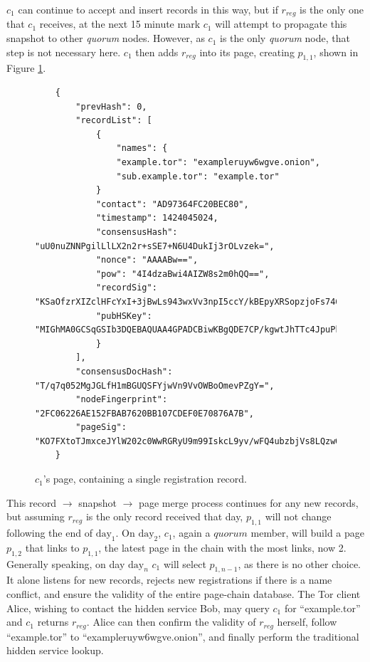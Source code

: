 $ c_{1} $ can continue to accept and insert records in this way, but if $ r_{reg} $ is the only one that $ c_{1} $ receives, at the next 15 minute mark $ c_{1} $ will attempt to propagate this snapshot to other \emph{quorum} nodes. However, as $ c_{1} $ is the only \emph{quorum} node, that step is not necessary here. $ c_{1} $ then adds $ r_{reg} $ into its page, creating $ p_{1,1} $, shown in Figure \ref{fig:c1page}.

\begin{figure}
	\begin{lstlisting}
	{
		"prevHash": 0,
		"recordList": [
			{
				"names": {
				"example.tor": "exampleruyw6wgve.onion",
				"sub.example.tor": "example.tor"
			}
			"contact": "AD97364FC20BEC80",
			"timestamp": 1424045024,
			"consensusHash": "uU0nuZNNPgilLlLX2n2r+sSE7+N6U4DukIj3rOLvzek=",
			"nonce": "AAAABw==",
			"pow": "4I4dzaBwi4AIZW8s2m0hQQ==",
			"recordSig": 	"KSaOfzrXIZclHFcYxI+3jBwLs943wxVv3npI5ccY/kBEpyXRSopzjoFs746n0tJqUpdY4Kbe6DBwERaN7ELmSSK9Pu6q8QeKzNAh+QOnKl0fKBN7fqowjkQ3ktFkR0Vuox9WrrbNTMa4+up0Np52hlbKA3zSRz4fbR9NVlh6uuQ=",
			"pubHSKey": "MIGhMA0GCSqGSIb3DQEBAQUAA4GPADCBiwKBgQDE7CP/kgwtJhTTc4JpuPkvA7Ln9wgc+fgTKgkyUp1zusxgUAn1c1MGx4YhO42KPB7dyZOf3pcRk94XsYFY1ULkF2+tf9KdNe7GFzJyMFCQENnUcVXbcwLH4vAeiGK7R/nScbCbyc9LT+VE1fbKchTL1QzLVBLqJTxhR+9YPi8x+QIFAdZ8BJs="
			}
		],
		"consensusDocHash": "T/q7q052MgJGLfH1mBGUQSFYjwVn9VvOWBoOmevPZgY=",
		"nodeFingerprint": "2FC06226AE152FBAB7620BB107CDEF0E70876A7B",
		"pageSig": "KO7FXtoTJmxceJYlW202c0WwRGRyU9m99IskcL9yv/wFQ4ubzbjVs8LQzwQub9kDJ8Htpc9rRZvneRRbusFv1nvaeJw+WgRt+Tck0uapndHKYaQcK3XTIFYdmT1lLm7QxSKjnIxgBkwKT0QWdGLUhuRgGe5CXmqrPeDfU/gsgLs="
	}
	\end{lstlisting}
	\caption{$ c_{1} $'s page, containing a single registration record.}
	\label{fig:c1page}
\end{figure}

This record $ \to $ snapshot $ \to $ page merge process continues for any new records, but assuming $ r_{reg} $ is the only record received that day, $ p_{1,1} $ will not change following the end of $ \textrm{day}_{1} $. On $ \textrm{day}_{2} $, $ c_{1} $, again a $ quorum $ member, will build a page $ p_{1,2} $ that links to $ p_{1,1} $, the latest page in the chain with the most links, now 2. Generally speaking, on day $ \textrm{day}_{n} $ $ c_{1} $ will select $ p_{1,n-1} $, as there is no other choice. It alone listens for new records, rejects new registrations if there is a name conflict, and ensure the validity of the entire page-chain database. The Tor client Alice, wishing to contact the hidden service Bob, may query $ c_{1} $ for ``example.tor'' and $ c_{1} $ returns $ r_{reg} $. Alice can then confirm the validity of $ r_{reg} $ herself, follow ``example.tor'' to ``exampleruyw6wgve.onion'', and finally perform the traditional hidden service lookup.


